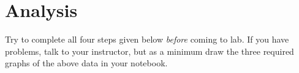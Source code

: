 
\section*{Analysis}
Try to complete all four steps given below {\em before} coming to lab.
If you have problems, talk to your instructor, but as a minimum
draw the three required graphs of the above data in your notebook.


